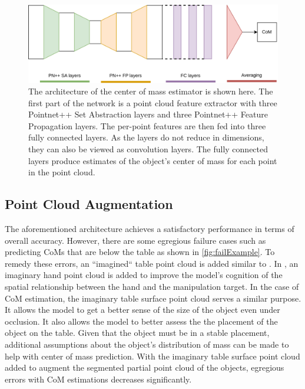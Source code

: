 \documentclass[12pt]{ucsddissertation}
\begin{document}
\begin{figure}
	\centering
	\includegraphics[width=\linewidth]{figures/Architecture.png}
	\caption[Architecture of the center of mass estimator]{The architecture of the center of mass estimator is shown here. The first part of the network is a point cloud feature extractor with three Pointnet++ Set Abstraction layers and three Pointnet++ Feature Propagation layers. The per-point features are then fed into three fully connected layers. As the layers do not reduce in dimensions, they can also be viewed as convolution layers. The fully connected layers produce estimates of the object's center of mass for each point in the point cloud.}
	\label{fig:architecture}
\end{figure}

\subsection{Point Cloud Augmentation}
The aforementioned architecture achieves a satisfactory performance in terms of overall accuracy. However, there are some egregious failure cases such as predicting CoMs that are below the table as shown in \ref{fig:failExample}. To remedy these errors, an ``imagined`` table point cloud is added similar to \cite{qin2022dexpoint}. In \cite{qin2022dexpoint}, an imaginary hand point cloud is added to improve the model's cognition of the spatial relationship between the hand and the manipulation target. In the case of CoM estimation, the imaginary table surface point cloud serves a similar purpose. It allows the model to get a better sense of the size of the object even under occlusion. It also allows the model to better assess the the placement of the object on the table. Given that the object must be in a stable placement, additional assumptions about the object's distribution of mass can be made to help with center of mass prediction. With the imaginary table surface point cloud added to augment the segmented partial point cloud of the objects, egregious errors with CoM estimations decreases significantly.
\end{document}
